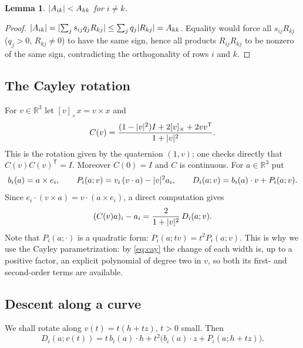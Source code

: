 \documentclass[11pt]{article}
\newtheorem{lemma}[theorem]{Lemma}
\theoremstyle{definition}
\theoremstyle{remark}
\newcommand{\R}{\mathbb{R}}
\DeclarePairedDelimiter{\abs}{\lvert}{\rvert}
\begin{document}
\begin{lemma}\label{lem:B1}
$\abs{A_{ik}}<A_{kk}$ for $i\neq k$.
\end{lemma}
\begin{proof}
$\abs{A_{ik}}=\abs{\sum_j s_{ij}q_jR_{kj}}\le\sum_jq_j\abs{R_{kj}}=A_{kk}$. Equality would force all
$s_{ij}R_{kj}$ ($q_j>0$, $R_{kj}\ne0$) to have the same sign, hence all products $R_{ij}R_{kj}$ to be
nonzero of the same sign, contradicting the orthogonality of rows $i$ and $k$.
\end{proof}

\subsection{The Cayley rotation}
For $v\in\R^3$ let $[v]_\times x=v\times x$ and
\[
C(v)=\frac{(1-\abs{v}^2)I+2[v]_\times+2vv^{\mathsf T}}{1+\abs{v}^2}.
\]
This is the rotation given by the quaternion $(1,v)$; one checks directly that $C(v)C(v)^{\mathsf T}=I$.
Moreover $C(0)=I$ and $C$ is continuous. For $a\in\R^3$ put
\[
b_i(a)=a\times e_i,\qquad P_i(a;v)=v_i\,(v\cdot a)-\abs{v}^2a_i,\qquad D_i(a;v)=b_i(a)\cdot v+P_i(a;v).
\]
Since $e_i\cdot(v\times a)=v\cdot(a\times e_i)$, a direct computation gives
\begin{equation}\label{eq:cay}
(C(v)a)_i-a_i=\frac{2}{1+\abs{v}^2}\,D_i(a;v).
\end{equation}
Note that $P_i(a;\cdot)$ is a quadratic form: $P_i(a;tv)=t^2P_i(a;v)$. This is why we use the Cayley
parametrization: by \eqref{eq:cay} the change of each width is, up to a positive factor, an explicit
polynomial of degree two in $v$, so both its first- and second-order terms are available.

\subsection{Descent along a curve}
We shall rotate along $v(t)=t(h+tz)$, $t>0$ small. Then
\begin{equation}\label{eq:curve}
D_i(a;v(t))=t\,b_i(a)\cdot h+t^2\bigl(b_i(a)\cdot z+P_i(a;h+tz)\bigr).
\end{equation}
\end{document}
